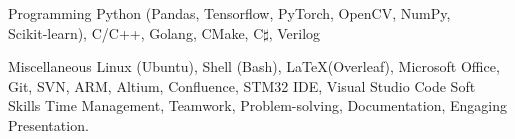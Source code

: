 


\begin{cvskills}

  \cvskill
    {Programming} %
    {Python (Pandas, Tensorflow, PyTorch, OpenCV, NumPy, Scikit‑learn), C/C++, Golang, CMake, C$\sharp$, Verilog} %

  \cvskill
    {Miscellaneous} %
    {Linux (Ubuntu), Shell (Bash), \LaTeX (Overleaf), Microsoft Office, Git, SVN, 
      ARM, Altium, Confluence, STM32 IDE, Visual Studio Code} %
  \cvskill
    {Soft Skills} %
    {Time Management, Teamwork, Problem-solving, Documentation, Engaging Presentation.} %

\end{cvskills}
